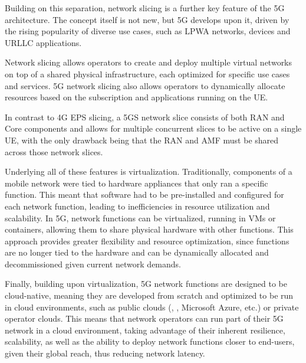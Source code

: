 \label{sec:network_slicing}
Building on this separation, network slicing is a further key feature of the 5G architecture. The concept itself is not new, but 5G develops upon it, driven by the rising popularity of diverse use cases, such as \gls{LPWA} networks,  devices and \gls{URLLC} applications.

Network slicing allows operators to create and deploy multiple virtual networks on top of a shared physical infrastructure, each optimized for specific use cases and services. 5G network slicing also allows operators to dynamically allocate resources based on the subscription and applications running on the \gls{UE}.

In contrast to 4G \gls{EPS} slicing, a 5GS network slice consists of both \gls{RAN} and Core components and allows for multiple concurrent slices to be active on a single \gls{UE}, with the only drawback being that the \gls{RAN} and \gls{AMF} must be shared across those network slices.

\label{sec:virtualization}
Underlying all of these features is virtualization. Traditionally, components of a mobile network were tied to hardware appliances that only ran a specific function. This meant that software had to be pre-installed and configured for each network function, leading to inefficiencies in resource utilization and scalability. In 5G, network functions can be virtualized, running in \glspl{VM} or containers, allowing them to share physical hardware with other functions. This approach provides greater flexibility and resource optimization, since functions are no longer tied to the hardware and can be dynamically allocated and decommissioned given current network demands.

\label{sec:cloud-native_functions}
Finally, building upon virtualization, 5G network functions are designed to be cloud-native, meaning they are developed from scratch and optimized to be run in cloud environments, such as public clouds (, , Microsoft Azure, etc.) or private operator clouds. This means that network operators can run part of their 5G network in a cloud environment, taking advantage of their inherent resilience, scalability, as well as the ability to deploy network functions closer to end-users, given their global reach, thus reducing network latency.

